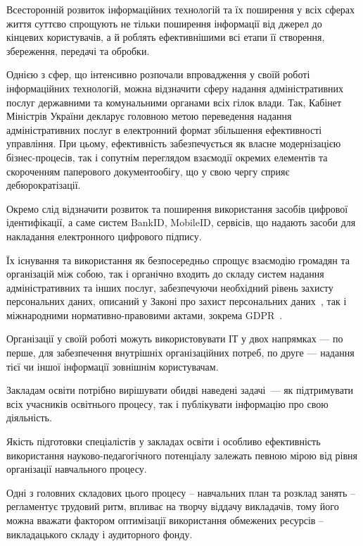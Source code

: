 
Всесторонній розвиток інформаційних технологій та їх поширення у всіх сферах життя суттєво спрощують не тільки поширення інформації від джерел до кінцевих користувачів, а й роблять ефективнішими всі етапи її створення, збереження, передачі та обробки.

Однією з сфер, що інтенсивно розпочали впровадження у своїй роботі інформаційних технологій, можна відзначити сферу надання адміністративних послуг державними та комунальними органами всіх гілок влади. Так, Кабінет Міністрів України декларує головною метою переведення надання адміністративних послуг в електронний формат збільшення ефективності управління. При цьому, ефективність забезпечується як власне модернізацією бізнес-процесів, так і сопутнім переглядом взаємодії окремих елементів та скороченням паперового документообігу, що у свою чергу сприяє дебюрократізації. 

Окремо слід відзначити розвиток та поширення використання засобів цифрової ідентифікації, а саме систем BankID, MobileID, сервісів, що надають засоби для накладання електронного цифрового підпису.

Їх існування та використання як безпосередньо спрощує взаємодію громадян та організацій між собою, так і органічно входить до складу систем надання адміністративних та інших послуг, забезпечуючи необхідний рівень захисту персональних даних, описаний у Законі про захист персональних даних~\cite{україни2010захист}, так і міжнародними нормативно-правовими актами, зокрема GDPR~\cite{goddard2017eu}.

Організації у своїй роботі можуть використовувати ІТ у двох напрямках --- по перше, для забезпечення внутрішніх організаційних потреб, по друге --- надання тієї чи іншої інформації зовнішнім користувачам.

Закладам освіти потрібно вирішувати обидві наведені задачі~--- як підтримувати всіх учасників освітнього процесу, так і публікувати інформацію про свою діяльність.

Якість підготовки спеціалістів у закладах освіти і особливо ефективність використання науково-педагогічного потенціалу залежать певною мірою від рівня організації навчального процесу.

Одні з головних складових цього процесу -- навчальних план та розклад занять -- регламентує трудовий ритм, впливає на творчу віддачу викладачів, тому його можна вважати фактором оптимізації використання обмежених ресурсів -- викладацького складу і аудиторного фонду.

